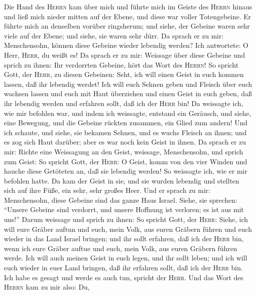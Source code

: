  Die Hand des \textsc{Herrn} kam über mich und führte mich
im Geiste des \textsc{Herrn} hinaus und ließ mich nieder mitten auf der
Ebene, und diese war voller Totengebeine.  Er führte mich
an denselben vorüber ringsherum; und siehe, der Gebeine waren sehr viele
auf der Ebene; und siehe, sie waren sehr dürr.  Da sprach
er zu mir: Menschensohn, können diese Gebeine wieder lebendig werden?
Ich antwortete: O Herr, \textsc{Herr}, du weißt es!  Da
sprach er zu mir: Weissage über diese Gebeine und sprich zu ihnen: Ihr
verdorrten Gebeine, hört das Wort des \textsc{Herrn}!  So
spricht Gott, der \textsc{Herr}, zu diesen Gebeinen: Seht, ich will
einen Geist in euch kommen lassen, daß ihr lebendig werdet!
 Ich will euch Sehnen geben und Fleisch über euch wachsen
lassen und euch mit Haut überziehen und einen Geist in euch geben, daß
ihr lebendig werden und erfahren sollt, daß ich der \textsc{Herr} bin!
 Da weissagte ich, wie mir befohlen war, und indem ich
weissagte, entstand ein Geräusch, und siehe, eine Bewegung, und die
Gebeine rückten zusammen, ein Glied zum andern!  Und ich
schaute, und siehe, sie bekamen Sehnen, und es wuchs Fleisch an ihnen;
und es zog sich Haut darüber; aber es war noch kein Geist in ihnen.
 Da sprach er zu mir: Richte eine Weissagung an den Geist,
weissage, Menschensohn, und sprich zum Geist: So spricht Gott, der
\textsc{Herr}: O Geist, komm von den vier Winden und hauche diese
Getöteten an, daß sie lebendig werden!  So weissagte ich,
wie er mir befohlen hatte. Da kam der Geist in sie, und sie wurden
lebendig und stellten sich auf ihre Füße, ein sehr, sehr großes Heer.
 Und er sprach zu mir: Menschensohn, diese Gebeine sind
das ganze Haus Israel. Siehe, sie sprechen: ``Unsere Gebeine sind
verdorrt, und unsere Hoffnung ist verloren; es ist aus mit uns!''
 Darum weissage und sprich zu ihnen: So spricht Gott, der
\textsc{Herr}: Siehe, ich will eure Gräber auftun und euch, mein Volk,
aus euren Gräbern führen und euch wieder in das Land Israel bringen;
 und ihr sollt erfahren, daß ich der \textsc{Herr} bin,
wenn ich eure Gräber auftue und euch, mein Volk, aus euren Gräbern
führen werde.  Ich will auch meinen Geist in euch legen,
und ihr sollt leben; und ich will euch wieder in euer Land bringen, daß
ihr erfahren sollt, daß ich der \textsc{Herr} bin. Ich habe es gesagt
und werde es auch tun, spricht der \textsc{Herr}.  Und
das Wort des \textsc{Herrn} kam zu mir also:  Du,
